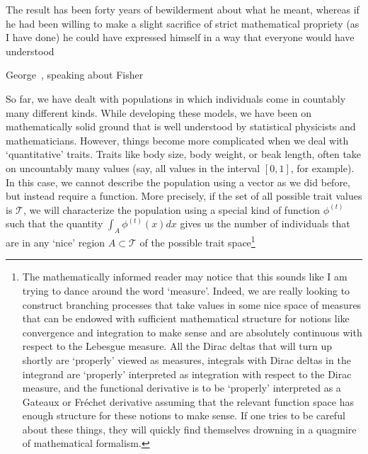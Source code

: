 \epigraph{\justifying The result has been forty years of bewilderment about what he meant, whereas if he had been willing to make a slight sacrifice of strict mathematical propriety (as I have done) he could have expressed himself in a way that everyone would have understood}{George~\citet{price_fishers_1972}, speaking about Fisher}


So far, we have dealt with populations in which individuals come in countably many different kinds. While developing these models, we have been on mathematically solid ground that is well understood by statistical physicists and mathematicians. However, things become more complicated when we deal with `quantitative' traits. Traits like body size, body weight, or beak length, often take on uncountably many values (say, all values in the interval $[0,1]$, for example). In this case, we cannot describe the population using a vector as we did before, but instead require a function. More precisely, if the set of all possible trait values is $\mathcal{T}$, we will characterize the population using a special kind of function $\phi^{(t)}$ such that the quantity $\int_{A}\phi^{(t)}(x)dx$ gives us the number of individuals that are in any `nice' region $A \subset \mathcal{T}$ of the possible trait space\footnote{The mathematically informed reader may notice that this sounds like I am trying to dance around the word `measure'. Indeed, we are really looking to construct branching processes that take values in some nice space of measures that can be endowed with sufficient mathematical structure for notions like convergence and integration to make sense and are absolutely continuous with respect to the Lebesgue measure. All the Dirac deltas that will turn up shortly are `properly' viewed as measures, integrals with Dirac deltas in the integrand are `properly' interpreted as integration with respect to the Dirac measure, and the functional derivative is to be `properly' interpreted as a Gateaux or  Fr\'echet derivative assuming that the relevant function space has enough structure for these notions to make sense. If one tries to be careful about these things, they will quickly find themselves drowning in a quagmire of mathematical formalism.
}
